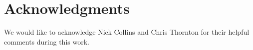 \documentclass[10pt,letterpaper]{article}
\begin{document}


\section*{Acknowledgments}
We would like to acknowledge Nick Collins and Chris Thornton for their helpful comments during this work. 
\pagebreak

\nolinenumbers

%
%
% 
\end{document}
